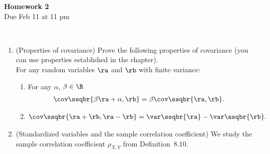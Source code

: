 \documentclass[12pt,twoside]{article}
\begin{document}
\begin{center}
{\large{\textbf{Homework 2}} } \vspace{0.2cm}\\
Due Feb 11 at 11 pm
\\
\end{center}
\\

\begin{enumerate}

\item (Properties of covariance) 
Prove the following properties of covariance (you can use properties established in the chapter).\\ 

For any random variables $\ra$ and $\rb$ with finite variance:
\begin{enumerate} 
\item For any $\alpha$, $\beta \in \R$
\begin{align}
\cov \ssqbr{\beta \ra + \alpha,\rb} & = \beta \cov \ssqbr{\ra,\rb}. 
\end{align} 
\item 
\begin{align}
\cov \ssqbr{\ra+\rb,\ra -\rb} = \var \ssqbr{\ra} - \var \ssqbr{\rb}.
\end{align}
\end{enumerate}

\item (Standardized variables and the sample correlation coefficient) 
We study the sample correlation coefficient $\rho_{X,Y} $ from Definition~8.10. 


\end{enumerate}
\end{document}
